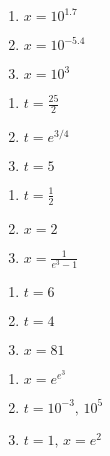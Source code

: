 \documentclass{ximera}
\begin{document}
\begin{multicols}{3}
\begin{enumerate}
\setcounter{enumi}{\value{HW}}

\item $x = 10^{1.7}$
\item $x = 10^{-5.4}$
\item $x = 10^{3}$

\setcounter{HW}{\value{enumi}}
\end{enumerate}
\end{multicols}

\begin{multicols}{3}
\begin{enumerate}
\setcounter{enumi}{\value{HW}}

\item $t=\frac{25}{2}$
\item $t=e^{3/4}$
\item $t = 5$

\setcounter{HW}{\value{enumi}}
\end{enumerate}
\end{multicols}

\begin{multicols}{3}
\begin{enumerate}
\setcounter{enumi}{\value{HW}}

\item $t = \frac{1}{2}$
\item $x = 2$
\item $x = \frac{1}{e^3-1}$

\setcounter{HW}{\value{enumi}}
\end{enumerate}
\end{multicols}

\begin{multicols}{3}
\begin{enumerate}
\setcounter{enumi}{\value{HW}}

\item $t=6$
\item $t=4$
\item $x = 81$

\setcounter{HW}{\value{enumi}}
\end{enumerate}
\end{multicols}

\begin{multicols}{3}
\begin{enumerate}
\setcounter{enumi}{\value{HW}}

\item $x = e^{e^3}$
\item $t=10^{-3}, \, 10^{5}$
\item $t = 1, \, x = e^{2}$

\setcounter{HW}{\value{enumi}}
\end{enumerate}
\end{multicols}
\end{document}
